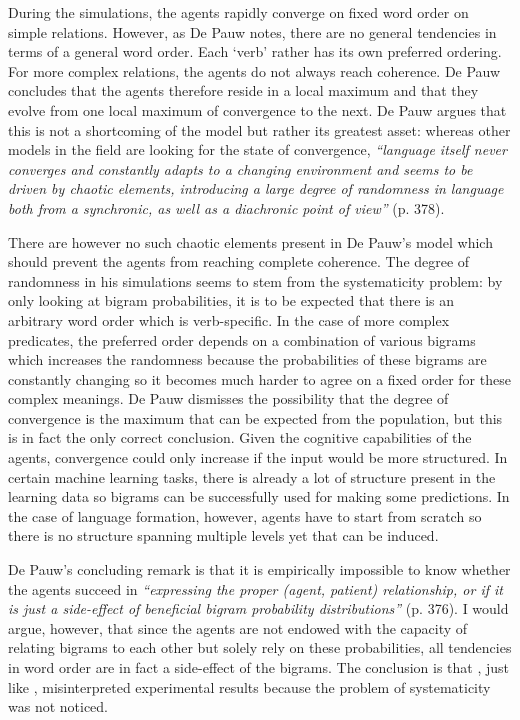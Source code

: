 During the simulations, the agents rapidly converge on fixed word order on simple relations. However, as De Pauw notes, there are no general tendencies in terms of a general word order. Each `verb' rather has its own preferred ordering. For more complex relations, the agents do not always reach coherence. De Pauw concludes that the agents therefore reside in a local maximum and that they evolve from one local maximum of convergence to the next. De Pauw argues that this is not a shortcoming of the model but rather its greatest asset: whereas other models in the field are looking for the state of convergence, {\em ``language itself never converges and constantly adapts to a changing environment and seems to be driven by chaotic elements, introducing a large degree of randomness in language both from a synchronic, as well as a diachronic point of view''} (p. 378).

There are however no such chaotic elements present in De Pauw's model which should prevent the agents from reaching complete coherence. The degree of randomness in his simulations seems to stem from the systematicity problem: by only looking at bigram probabilities, it is to be expected that there is an arbitrary word order which is verb-specific. In the case of more complex predicates, the preferred order depends on a combination of various bigrams which increases the randomness because the probabilities of these bigrams are constantly changing so it becomes much harder to agree on a fixed order for these complex meanings. De Pauw dismisses the possibility that the degree of convergence is the maximum that can be expected from the population, but this is in fact the only correct conclusion. Given the cognitive capabilities of the agents, convergence could only increase if the input would be more structured. In certain machine learning tasks, there is already a lot of structure present in the learning data so bigrams can be successfully used for making some predictions. In the case of language formation, however, agents have to start from scratch so there is no structure spanning multiple levels yet that can be induced.

De Pauw's concluding remark is that it is empirically impossible to know whether the agents succeed in {\em ``expressing the proper (agent, patient) relationship, or if it is just a side-effect of beneficial bigram probability distributions''} (p. 376). I would argue, however, that since the agents are not endowed with the capacity of relating bigrams to each other but solely rely on these probabilities, all tendencies in word order are in fact a side-effect of the bigrams. The conclusion is that \citet{depauw02grael}, just like \citet{batali02negotiation}, misinterpreted experimental results because the problem of systematicity was not noticed.


